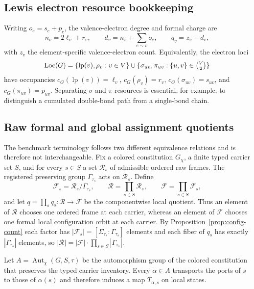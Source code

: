 \documentclass[pdflatex,sn-mathphys-num,referee,lineno]{sn-jnl}
\theoremstyle{plain}
\theoremstyle{remark}
\theoremstyle{definition}
\begin{document}
\subsection{Lewis electron resource bookkeeping}
\label{sec:llg-bookkeeping}

Writing \(o_e=s_e+p_e\), the valence-electron degree and formal charge are
\begin{equation}
  n_v=2\ell_v+r_v,\qquad
  d_v=n_v+\sum_{e\sim v}o_e,\qquad
  q_v=z_v-d_v ,
  \label{eq:llg-derived}
\end{equation}
with \(z_v\) the element-specific valence-electron count.  Equivalently, the
electron loci
\[
  \operatorname{Loc}(G)=
  \{\operatorname{lp}(v),\rho_v:v\in V\}
  \cup
  \{\sigma_{uv},\pi_{uv}:\{u,v\}\in\tbinom V2\}
\]
have occupancies \(c_G(\operatorname{lp}(v))=\ell_v\),
\(c_G(\rho_v)=r_v\), \(c_G(\sigma_{uv})=s_{uv}\), and
\(c_G(\pi_{uv})=p_{uv}\).  Separating \(\sigma\) and \(\pi\) resources is
essential, for example, to distinguish a cumulated double-bond path from a
single-bond chain.



\subsection{Raw formal and global assignment quotients}
\label{sec:quotient-details}

The benchmark terminology follows two different equivalence relations and is
therefore not interchangeable.  Fix a colored constitution \(G_\chi\), a
finite typed carrier set \(S\), and for every \(s\in S\) a set
\(\mathcal R_s\) of admissible ordered raw frames.  The registered preserving
group \(\Gamma_{\tau_s}\) acts on \(\mathcal R_s\).  Define
\[
  \mathcal F_s=\mathcal R_s/\Gamma_{\tau_s},\qquad
  \mathcal R=\prod_{s\in S}\mathcal R_s,\qquad
  \mathcal F=\prod_{s\in S}\mathcal F_s,
\]
and let \(q=\prod_s q_s:\mathcal R\to\mathcal F\) be the componentwise local
quotient.  Thus an element of \(\mathcal R\) chooses one ordered frame at each
carrier, whereas an element of \(\mathcal F\) chooses one formal local
configuration orbit at each carrier.  By Proposition~\ref{prop:config-count}
each factor has \(|\mathcal F_s|=[\Sigma_{\tau_s}:\Gamma_{\tau_s}]\) elements
and each fiber of \(q_s\) has exactly \(|\Gamma_{\tau_s}|\) elements, so
\(|\mathcal R|=|\mathcal F|\cdot\prod_{s\in S}|\Gamma_{\tau_s}|\).

Let \(A=\operatorname{Aut}_\chi(G,S,\tau)\) be the automorphism group of the
colored constitution that preserves the typed carrier inventory.  Every
\(\alpha\in A\) transports the ports of \(s\) to those of \(\alpha(s)\) and
therefore induces a map \(T_{\alpha,s}\) on local states.
\end{document}
